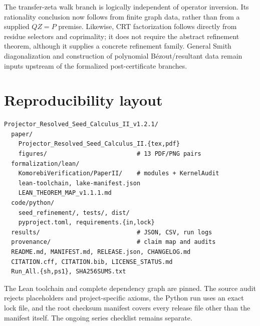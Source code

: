 \documentclass[11pt]{article}
\theoremstyle{definition}
\theoremstyle{remark}
\begin{document}
The transfer-zeta walk branch is logically independent of operator inversion. Its
rationality conclusion now follows from finite graph data, rather than from a
supplied $QZ=P$ premise. Likewise, CRT factorization follows directly from
residue selectors and coprimality; it does not require the abstract refinement
theorem, although it supplies a concrete refinement family. General Smith
diagonalization and construction of polynomial B\'ezout/resultant data remain
inputs upstream of the formalized post-certificate branches.

\section{Reproducibility layout}

\begin{lstlisting}
Projector_Resolved_Seed_Calculus_II_v1.2.1/
  paper/
    Projector_Resolved_Seed_Calculus_II.{tex,pdf}
    figures/                         # 13 PDF/PNG pairs
  formalization/lean/
    KomorebiVerification/PaperII/    # modules + KernelAudit
    lean-toolchain, lake-manifest.json
    LEAN_THEOREM_MAP_v1.1.1.md
  code/python/
    seed_refinement/, tests/, dist/
    pyproject.toml, requirements.{in,lock}
  results/                           # JSON, CSV, run logs
  provenance/                        # claim map and audits
  README.md, MANIFEST.md, RELEASE.json, CHANGELOG.md
  CITATION.cff, CITATION.bib, LICENSE_STATUS.md
  Run_All.{sh,ps1}, SHA256SUMS.txt
\end{lstlisting}

The Lean toolchain and complete dependency graph are pinned. The source audit
rejects placeholders and project-specific axioms, the Python run uses an exact
lock file, and the root checksum manifest covers every release file other than
the manifest itself. The ongoing series checklist remains separate.
\end{document}
